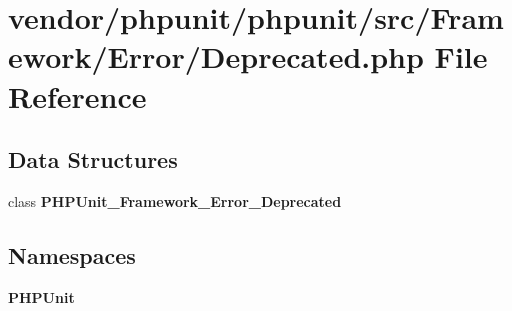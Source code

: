 \section{vendor/phpunit/phpunit/src/\+Framework/\+Error/\+Deprecated.php File Reference}
\label{_deprecated_8php}
\subsection*{Data Structures}
\begin{DoxyCompactItemize}
\item 
class {\bf P\+H\+P\+Unit\+\_\+\+Framework\+\_\+\+Error\+\_\+\+Deprecated}
\end{DoxyCompactItemize}
\subsection*{Namespaces}
\begin{DoxyCompactItemize}
\item 
 {\bf P\+H\+P\+Unit}
\end{DoxyCompactItemize}
